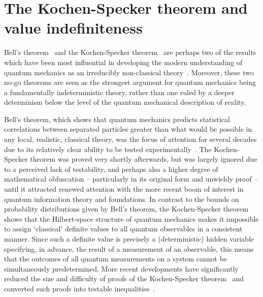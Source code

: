 \documentclass[%
 superscriptaddress,
 preprint,
 showpacs,
 showkeys,
 nofootinbib,
  amsmath,amssymb,
  aps,
  longbibliography,
  floatfix,
 ]{revtex4-1}
\theoremstyle{definition}
\begin{document}
\section{The Kochen-Specker theorem and value indefiniteness}

Bell's theorem~\cite{Bell:1966uq} and the Kochen-Specker theorem~\cite{Kochen:1967fk} are perhaps two of the results which have been most influential in developing the modern understanding of quantum mechanics as an irreducibly non-classical theory~\cite{Mermin:1993qy,Pitowsky:1998aa}.
Moreover, these two no-go theorems are seen as the strongest argument for quantum mechanics being a fundamentally indeterministic theory, rather than one ruled by a deeper determinism below the level of the quantum mechanical description of reality.

Bell's theorem, which shows that quantum mechanics predicts statistical correlations between separated particles greater than what would be possible in any local, realistic, classical theory, was the focus of attention for several decades due to its relatively clear ability to be tested experimentally~\cite{Aspect:1982dp}.
The Kochen-Specker theorem was proved very shortly afterwards, but was largely ignored due to a perceived lack of testability, and perhaps also a higher degree of mathematical obfuscation -- particularly in its original form and unwieldy proof -- until it attracted renewed attention with the more recent boom of interest in quantum information theory and foundations.
In contrast to the bounds on probability distributions given by Bell's theorem, the Kochen-Specker theorem shows that the Hilbert-space structure of quantum mechanics makes it  impossible to assign `classical' definite values to all quantum observables in a consistent manner.
Since such a definite value is precisely a (deterministic) hidden variable specifying, in advance, the result of a measurement of an observable, this means that the outcomes of all quantum measurements on a system cannot be simultaneously predetermined.
More recent developments have significantly reduced the size and difficulty of proofs of the Kochen-Specker theorem~\cite{Cabello:1996zr} and converted such proofs into testable inequalities~\cite{Cabello:2008hc}.
\end{document}
